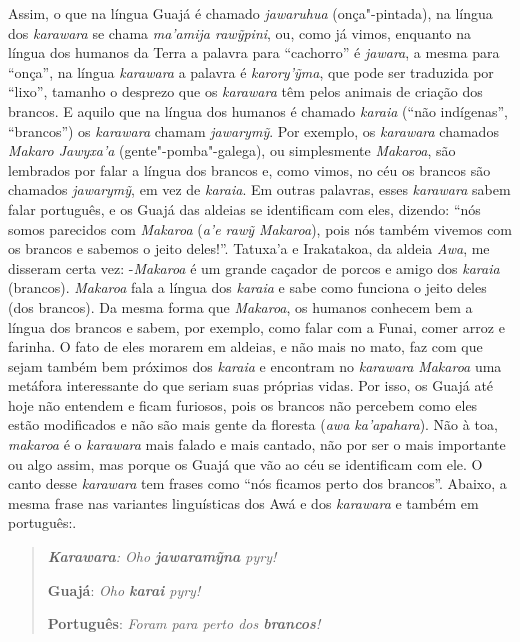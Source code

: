 Assim, o que na língua Guajá é chamado \emph{jawaruhua} (onça"-pintada),
na língua dos \emph{karawara} se chama \emph{ma'amija rawỹpini}, ou,
como já vimos, enquanto na língua dos humanos da Terra a palavra para
``cachorro'' é \emph{jawara}, a mesma para ``onça'', na língua
\emph{karawara} a palavra é \emph{karory'ỹma}, que pode ser traduzida
por ``lixo'', tamanho o desprezo que os \emph{karawara} têm pelos
animais de criação dos brancos. E aquilo que na língua dos humanos é
chamado \emph{karaia} (``não indígenas'', ``brancos'') os
\emph{karawara} chamam \emph{jawarymỹ}. Por exemplo, os \emph{karawara}
chamados \emph{Makaro Jawyxa'a} (gente"-pomba"-galega), ou simplesmente
\emph{Makaroa}, são lembrados por falar a língua dos brancos e, como
vimos, no céu os brancos são chamados \emph{jawarymỹ}, em vez de
\emph{karaia}. Em outras palavras, esses \emph{karawara} sabem falar
português, e os Guajá das aldeias se identificam com eles, dizendo:
``nós somos parecidos com \emph{Makaroa} (\emph{a'e rawỹ Makaroa}), pois
nós também vivemos com os brancos e sabemos o jeito deles!''. Tatuxa'a e
Irakatakoa, da aldeia \emph{Awa}, me disseram certa vez: -\emph{Makaroa}
é um grande caçador de porcos e amigo dos \emph{karaia} (brancos).
\emph{Makaroa} fala a língua dos \emph{karaia} e sabe como funciona o
jeito deles (dos brancos). Da mesma forma que \emph{Makaroa}, os humanos
conhecem bem a língua dos brancos e sabem, por exemplo, como falar com a
Funai, comer arroz e farinha. O fato de eles morarem em aldeias, e não
mais no mato, faz com que sejam também bem próximos dos \emph{karaia} e
encontram no \emph{karawara} \emph{Makaroa} uma metáfora interessante do
que seriam suas próprias vidas. Por isso, os Guajá até hoje não entendem
e ficam furiosos, pois os brancos não percebem como eles estão
modificados e não são mais gente da floresta (\emph{awa ka'apahara}).
Não à toa, \emph{makaroa} é o \emph{karawara} mais falado e mais
cantado, não por ser o mais importante ou algo assim, mas porque os
Guajá que vão ao céu se identificam com ele. O canto desse
\emph{karawara} tem frases como ``nós ficamos perto dos brancos''.
Abaixo, a mesma frase nas variantes linguísticas dos Awá e dos
\emph{karawara} e também em português:.

\begin{quote}
\emph{\textbf{Karawara}: Oho \textbf{{jawaramỹna}} pyry!}

\textbf{Guajá}: \emph{Oho \textbf{{karai}} pyry!}

\textbf{Português}: \emph{Foram para perto dos \textbf{{brancos}}!}
\end{quote}

